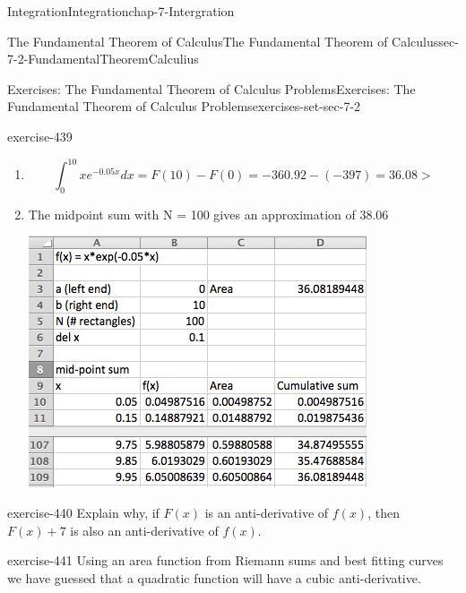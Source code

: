 \documentclass[oneside,10pt,]{book}
\numberwithin{equation}{section}
\begin{document}
\begin{chapterptx}{Integration}{}{Integration}{}{}{chap-7-Intergration}
\begin{sectionptx}{The Fundamental Theorem of Calculus}{}{The Fundamental Theorem of Calculus}{}{}{sec-7-2-FundamentalTheoremCalculius}
\begin{exercises-subsection-numberless}{Exercises: The Fundamental Theorem of Calculus Problems}{}{Exercises: The Fundamental Theorem of Calculus Problems}{}{}{exercises-set-sec-7-2}
\begin{divisionexercise}{5}{}{}{exercise-439}
\begin{enumerate}[label=(\alph*)]
%
\begin{equation*}
=e^{-0.05x}  [(-20)+(x+20)] 
\end{equation*}
%
\begin{equation*}
=e^{-0.05x} x 
\end{equation*}
%
\item\hypertarget{li-732}{}%
\begin{equation*}
\int_0^{10}x e^{-0.05 x} dx=F(10)-F(0)=-360.92-(-397)=36.08>
\end{equation*}
%
\item\hypertarget{li-733}{}\hypertarget{p-2681}{}%
The midpoint sum with N = 100 gives an approximation of 38.06%
\begin{sidebyside}{1}{0.25}{0.25}{0}%
\begin{sbspanel}{0.5}%
\includegraphics[width=1\linewidth]{images/sec7-2-sol5a.png}
\end{sbspanel}%
\end{sidebyside}%
\end{enumerate}
\end{divisionexercise}%
\begin{divisionexercise}{6}{}{}{exercise-440}%
\hypertarget{p-2682}{}%
Explain why, if \(F(x)\) is an anti-derivative of \(f(x)\), then \(F(x) + 7\) is also an anti-derivative of \(f(x)\).%
\end{divisionexercise}%
\begin{divisionexercise}{7}{}{}{exercise-441}%
\hypertarget{p-2683}{}%
Using an area function from Riemann sums and best fitting curves we have guessed that a quadratic function will have a cubic anti-derivative.%
\leavevmode%

\end{divisionexercise}
\end{exercises-subsection-numberless}
\end{sectionptx}
\end{chapterptx}
\end{document}

